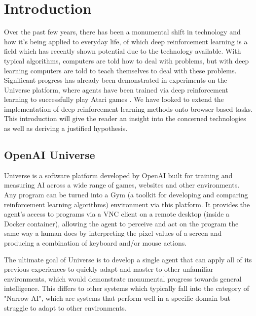 \documentclass[conference]{IEEEtran}
\begin{document}
%
\IEEEpeerreviewmaketitle

\section{Introduction}
Over the past few years, there has been a monumental shift in technology and how it's being applied to everyday life, of which deep reinforcement learning is a field which has recently shown potential due to the technology available. With typical algorithms, computers are told how to deal with problems, but with deep learning computers are told to teach themselves to deal with these problems. Significant progress has already been demonstrated in experiments on the Universe platform, where agents have been trained via deep reinforcement learning to successfully play Atari games \cite{mnih2013playing}. We have looked to extend the implementation of deep reinforcement learning methods onto browser-based tasks. This introduction will give the reader an insight into the concerned technologies as well as deriving a justified hypothesis. 

\subsection{OpenAI Universe}
Universe is a software platform developed by OpenAI built for training and measuring AI across a wide range of games, websites and other environments. Any program can be turned into a Gym (a toolkit for developing and comparing reinforcement learning algorithms) environment via this platform. It provides the agent's access to programs via a VNC client on a remote desktop (inside a Docker container), allowing the agent to perceive and act on the program the same way a human does by interpreting the pixel values of a screen and producing a combination of keyboard and/or mouse actions. 

The ultimate goal of Universe is to develop a single agent that can apply all of its previous experiences to quickly adapt and master to other unfamiliar environments, which would demonstrate monumental progress towards general intelligence. This differs to other systems which typically fall into the category of "Narrow AI", which are systems that perform well in a specific domain but struggle to adapt to other environments. 
\end{document}
